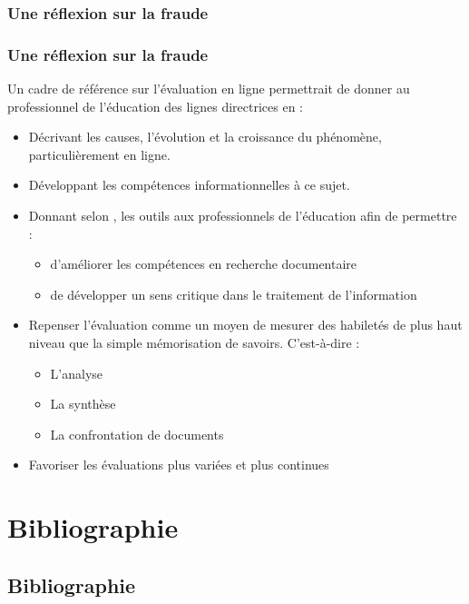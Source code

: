\documentclass[aspectratio=169]{beamer}
\begin{document}
			\subsubsection{Une réflexion sur la fraude \citep{Dubreucq2011}} 
				\begin{frame}[allowframebreaks]
			 		\frametitle{Une réflexion sur la fraude \citep{Dubreucq2011}}
			 		Un cadre de référence sur l'évaluation en ligne permettrait de donner au professionnel de l'éducation des lignes directrices en : 
					\begin {itemize}
						\item Décrivant les causes, l'évolution et la croissance du phénomène, particulièrement en ligne.
						\item Développant les compétences informationnelles à ce sujet.
						\item Donnant selon \citet{bergadaa2008relation}, les outils aux professionnels de l'éducation afin de permettre  :
							\begin {itemize}
								\item d'améliorer les compétences en recherche documentaire
								\item de développer un sens critique dans le traitement de l'information 
							\end{itemize}
						\item Repenser l'évaluation comme un moyen de mesurer des habiletés de plus haut niveau que la simple mémorisation de savoirs. C'est-à-dire :
							\begin {itemize}
								\item L'analyse
								\item La synthèse 
								\item La confrontation de documents
							\end{itemize}
						\item Favoriser les évaluations plus variées et plus continues
								
					\end{itemize}
				\end{frame}
			


\section{Bibliographie}
\subsection{Bibliographie}
\end{document}
